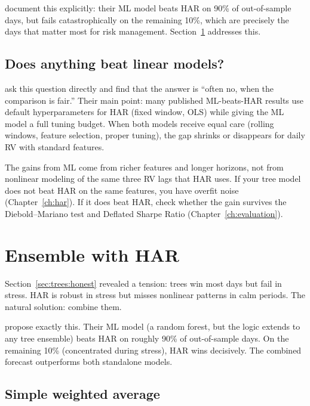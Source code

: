 \citet{RahimikiaPoon2020} document this explicitly: their ML model beats HAR
on 90\% of out-of-sample days, but fails catastrophically on the remaining
10\%, which are precisely the days that matter most for risk management.
Section~\ref{sec:trees:ensemble} addresses this.

\subsection*{Does anything beat linear models?}

\citet{BrancoRubesamZevallos2024} ask this question directly and find that
the answer is ``often no, when the comparison is fair.''  Their main point:
many published ML-beats-HAR results use default hyperparameters for HAR
(fixed window, OLS) while giving the ML model a full tuning budget.  When
both models receive equal care (rolling windows, feature selection, proper
tuning), the gap shrinks or disappears for daily RV with standard features.

\begin{keyidea}
The gains from ML come from richer features and longer horizons, not from
nonlinear modeling of the same three RV lags that HAR uses.  If your tree
model does not beat HAR on the same features, you have overfit noise
(Chapter~\ref{ch:har}).  If it does beat HAR, check whether the gain
survives the Diebold--Mariano test and Deflated Sharpe Ratio
(Chapter~\ref{ch:evaluation}).
\end{keyidea}


\section{Ensemble with HAR}\label{sec:trees:ensemble}

Section~\ref{sec:trees:honest} revealed a tension: trees win most days but
fail in stress.  HAR is robust in stress but misses nonlinear patterns in
calm periods.  The natural solution: combine them.

\citet{RahimikiaPoon2020} propose exactly this.  Their ML model (a
random forest, but the logic extends to any tree ensemble) beats HAR on
roughly 90\% of out-of-sample days.  On the remaining 10\% (concentrated
during stress), HAR wins decisively.  The combined forecast outperforms both
standalone models.

\subsection*{Simple weighted average}

